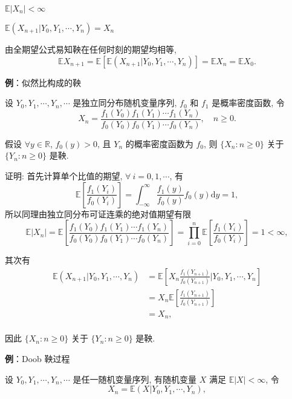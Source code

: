 \documentclass[openany]{ctexbook}
\theoremstyle{kaiti}
\theoremstyle{normal}
\begin{document}
$\mathbb{E}|X_n|<\infty$

$\mathbb{E}(X_{n+1}|Y_0,Y_1,\cdots,Y_n)=X_n$

由全期望公式易知鞅在任何时刻的期望均相等,
\begin{equation}
  \mathbb{E}X_{n+1}=\mathbb{E}[\mathbb{E}(X_{n+1}|Y_0,Y_1,\cdots,Y_n)]=\mathbb{E}X_n=\mathbb{E}X_0.
\end{equation}

\textbf{例}：似然比构成的鞅

设 $Y_0,Y_1,\cdots,Y_n,\cdots$ 是独立同分布随机变量序列, $f_0$ 和 $f_1$ 是概率密度函数, 令
\begin{equation}
  X_n=\frac{f_1(Y_0)f_1(Y_1)\cdots f_1(Y_n)}{f_0(Y_0)f_0(Y_1)\cdots f_0(Y_n)},\quad n\geqslant0.
\end{equation}

假设 $\forall y\in\mathbb{R}$, $f_0(y)>0$, 且 $Y_n$ 的概率密度函数为 $f_0$, 则 $\{X_n:n\geqslant0\}$ 关于 $\{Y_n:n\geqslant0\}$ 是鞅.

证明: 首先计算单个比值的期望, $\forall~i=0,1,\cdots$, 有
\begin{equation}
  \mathbb{E}\left[\frac{f_1(Y_{i})}{f_0(Y_{i})}\right]=\int_{-\infty}^\infty\frac{f_1(y)}{f_0(y)}f_0(y)\mathrm{d}y=1,
\end{equation}
所以同理由独立同分布可证连乘的绝对值期望有限
\begin{equation}
  \mathbb{E}|X_n|=\mathbb{E}\left[\frac{f_1(Y_0)f_1(Y_1)\cdots f_1(Y_n)}{f_0(Y_0)f_0(Y_1)\cdots f_0(Y_n)}\right]=\prod_{i=0}^n\mathbb{E}\left[\frac{f_1(Y_{i})}{f_0(Y_{i})}\right]=1<\infty,
\end{equation}

其次有
\begin{equation}
  \begin{aligned}
    \mathbb{E}(X_{n+1}|Y_0,Y_1,\cdots,Y_n)
    &=\mathbb{E}\left[X_n\frac{f_1(Y_{n+1})}{f_0(Y_{n+1})}|Y_0,Y_1,\cdots,Y_n\right]\\
    &=X_n\mathbb{E}\left[\frac{f_1(Y_{n+1})}{f_0(Y_{n+1})}\right]\\
    &=X_n,\\
  \end{aligned}
\end{equation}

因此 $\{X_n:n\geqslant0\}$ 关于 $\{Y_n:n\geqslant0\}$ 是鞅.

\textbf{例}：Doob 鞅过程

设 $Y_0,Y_1,\cdots,Y_n,\cdots$ 是任一随机变量序列, 有随机变量 $X$ 满足 $\mathbb{E}|X|<\infty$, 令
\begin{equation}
  X_n=\mathbb{E}(X|Y_0,Y_1,\cdots,Y_n),
\end{equation}
\end{document}
